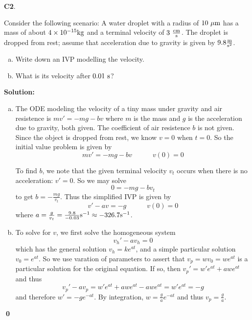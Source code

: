 \documentclass{article}
\newenvironment{problem}[1]
{
  \begin{flushleft}
  \textbf{#1}.
  \ignorespaces
}
{
  \end{flushleft}
}
\newenvironment{solution}
{
  \ignorespaces
  \textbf{Solution:}
}
{
  \ignorespacesafterend
  \begin{flushright}
  {\bfseries \qed}
  \end{flushright}
}
\begin{document}
\begin{problem}{C2}
Consider the following scenario: 
A water droplet with a radius of \(10\ {\rm \mu m}\) has a mass of about \(4 \times 10^{-15} {\rm kg}\) 
and a terminal velocity of \(3\ {\rm \frac{cm}{s}}\).  The droplet is dropped from rest;
assume that acceleration due to gravity is given by \(9.8{\rm\frac{m}{s^2}}\).
\begin{enumerate}[(a)]
\item Write down an IVP modelling the velocity.
\item What is its velocity after \(0.01\ {\rm s}\)?
\end{enumerate}
\end{problem}
\begin{solution}
\begin{enumerate}[(a)]
\item 
%
The ODE modeling the velocity of a tiny mass under gravity and air resistence
is \(mv'=-mg-bv\)
where \(m\) is the mass and \(g\) is the acceleration due to gravity, both given.
The coefficient of air resistence \(b\) is not given.
Since the object is dropped from rest, we know \(v=0\) when \(t=0\). So the initial value problem is given by
\[mv'=-mg-bv\hspace{3em}v(0)=0\]

To find \(b\), we note that the given terminal velocity 
\(v_t\) occurs when
there is no acceleration: \(v'=0\). So we may solve
\[0=-mg-bv_t\]
to get \(b=-\frac{mg}{v_t}\). Thus the simplified IVP is given by
\[v'-av=-g\hspace{3em}v(0)=0\]
where \(a=\frac{g}{v_t} = \frac{9.8}{-0.03} {\rm s^{-1}} \approx -326.7 {\rm s^{-1}}\).

\item To solve for \(v\), we first solve the homogeneous system
\[v_h'-av_h=0\]
which has the general solution \(v_h=ke^{at}\), and a simple
particular solution \(v_0=e^{at}\). So we use varation of parameters to
assert that \(v_p=wv_0=we^{at}\) is a particular solution for the original equation.
If so, then \(v_p'=w'e^{at}+awe^{at}\) and thus
\[v_p'-av_p=w'e^{at}+awe^{at}-awe^{at}=w'e^{at}=-g\]
and therefore \(w'=-ge^{-at}\). By integration, \(w=\frac{g}{a}e^{-at}\)
and thus \(v_p=\frac{g}{a}\).


\end{enumerate}
\end{solution}
\end{document}
